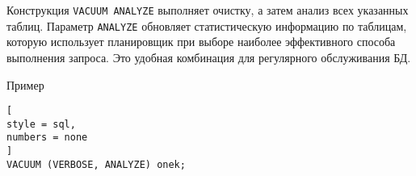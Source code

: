 \documentclass[%
	11pt,
	a4paper,
	utf8,
		]{article}
\begin{document}
Конструкция \texttt{VACUUM ANALYZE} выполняет очистку, а затем анализ всех указанных таблиц. Параметр \texttt{ANALYZE} обновляет статистическую информацию по таблицам, которую использует планировщик при выборе наиболее эффективного способа выполнения запроса. Это удобная комбинация для регулярного обслуживания БД.

Пример
\begin{lstlisting}[
style = sql,
numbers = none
]
VACUUM (VERBOSE, ANALYZE) onek;
\end{lstlisting}



\begin{thebibliography}{99}
	
	
\end{thebibliography}

\end{document}
